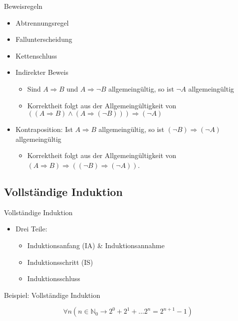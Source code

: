 \documentclass[12pt%
,aspectratio=169%
]{beamer}
\begin{document}
\begin{frame}{Beweisregeln}
\begin{itemize}
	\item Abtrennungsregel
	\item Fallunterscheidung
	\item Kettenschluss
	\item Indirekter Beweis
	\begin{itemize}
		\item Sind $A \Rightarrow B$ und $A \Rightarrow \neg B$ allgemeingültig, so ist $\neg A$ allgemeingültig
		\item Korrektheit folgt aus der Allgemeingültigkeit von $((A \Rightarrow B) \land (A \Rightarrow (\neg B))) \Rightarrow (\neg A)$
	\end{itemize}
	\item Kontraposition:  Ist $A \Rightarrow B$ allgemeingültig, so ist $(\neg B) \Rightarrow (\neg A)$ allgemeingültig
	\begin{itemize}
		\item Korrektheit folgt aus der Allgemeingültigkeit von $(A \Rightarrow B) \Rightarrow ((\neg B) \Rightarrow (\neg A))$.
	\end{itemize}
\end{itemize}
\end{frame}

\subsection{Vollständige Induktion}
\begin{frame}{Vollständige Induktion}
\begin{itemize}
	\item Drei Teile: 
	\begin{itemize}
		\item Induktionsanfang (IA) \& Induktionsannahme
		\item Induktionsschritt (IS)
		\item Induktionsschluss
	\end{itemize}
\end{itemize}
\end{frame}

\begin{frame}{Beispiel: Vollständige Induktion}
\begin{theorem}
$$\forall n (n \in \mathbb{N}_0 \rightarrow 2^0 + 2^1 + \dots 2^n = 2^{n+1}-1)$$
\end{theorem}
\end{frame}
\end{document}
